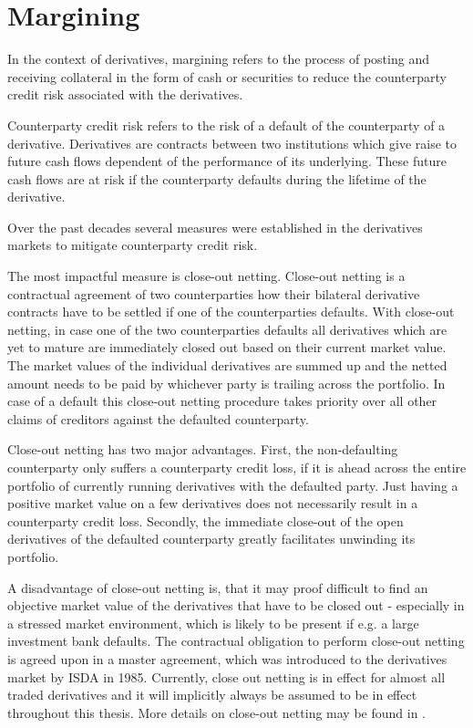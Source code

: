 \documentclass[../Thesis_AHoecherl.tex]{subfiles}
\begin{document}
\section{Margining}\label{Margining}

In the context of derivatives, margining refers to the process of posting and receiving collateral in the form of cash or securities to reduce the counterparty credit risk associated with the derivatives.

Counterparty credit risk refers to the risk of a default of the counterparty of a derivative. Derivatives are contracts between two institutions which give raise to future cash flows dependent of the performance of its underlying. These future cash flows are at risk if the counterparty defaults during the lifetime of the derivative. 

Over the past decades several measures were established in the derivatives markets to mitigate counterparty credit risk.

The most impactful measure is close-out netting. Close-out netting is a contractual agreement of two counterparties how their bilateral derivative contracts have to be settled if one of the counterparties defaults. With close-out netting, in case one of the two counterparties defaults all derivatives which are yet to mature are immediately closed out based on their current market value. The market values of the individual derivatives are summed up and the netted amount needs to be paid by whichever party is trailing across the portfolio. In case of a default this close-out netting procedure takes priority over all other claims of creditors against the defaulted counterparty. 

Close-out netting has two major advantages. 
First, the non-defaulting counterparty only suffers a counterparty credit loss, if it is ahead across the entire portfolio of currently running derivatives with the defaulted party. Just having a positive market value on a few derivatives does not necessarily result in a counterparty credit loss. Secondly, the immediate close-out of the open derivatives of the defaulted counterparty greatly facilitates unwinding its portfolio. 

A disadvantage of close-out netting is, that it may proof difficult to find an objective market value of the derivatives that have to be closed out - especially in a stressed market environment, which is likely to be present if e.g. a large investment bank defaults. The contractual obligation to perform close-out netting is agreed upon in a master agreement, which was introduced to the derivatives market by \gls{ISDA} in 1985. Currently, close out netting is in effect for almost all traded derivatives and it will implicitly always be assumed to be in effect throughout this thesis. More details on close-out netting may be found in \cite[Chapter~5]{gregory2015xva}.
\end{document}
